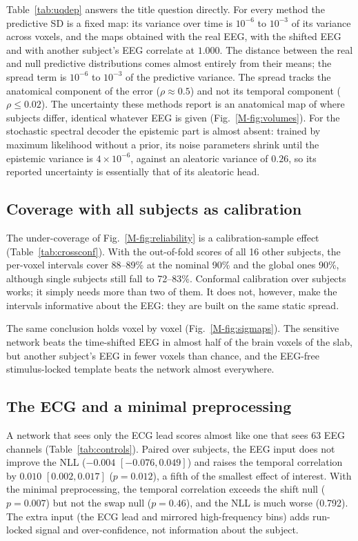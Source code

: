 Table~\ref{tab:uqdep} answers the title question directly. For every method the predictive SD is a fixed map: its variance over time is $10^{-6}$ to $10^{-3}$ of its variance across voxels, and the maps obtained with the real EEG, with the shifted EEG and with another subject's EEG correlate at $1.000$. The distance between the real and null predictive distributions comes almost entirely from their means; the spread term is $10^{-6}$ to $10^{-3}$ of the predictive variance. The spread tracks the anatomical component of the error ($\rho\approx0.5$) and not its temporal component ($\rho\le0.02$). The uncertainty these methods report is an anatomical map of where subjects differ, identical whatever EEG is given (Fig.~\ref{M-fig:volumes}). For the stochastic spectral decoder the epistemic part is almost absent: trained by maximum likelihood without a prior, its noise parameters shrink until the epistemic variance is $4\times10^{-6}$, against an aleatoric variance of $0.26$, so its reported uncertainty is essentially that of its aleatoric head.

\subsection{Coverage with all subjects as calibration}\label{sec:res:crossconformal}
The under-coverage of Fig.~\ref{M-fig:reliability} is a calibration-sample effect (Table~\ref{tab:crossconf}). With the out-of-fold scores of all 16 other subjects, the per-voxel intervals cover 88--89\% at the nominal 90\% and the global ones 90\%, although single subjects still fall to 72--83\%. Conformal calibration over subjects works; it simply needs more than two of them. It does not, however, make the intervals informative about the EEG: they are built on the same static spread.



The same conclusion holds voxel by voxel (Fig.~\ref{M-fig:sigmaps}). The sensitive network beats the time-shifted EEG in almost half of the brain voxels of the slab, but another subject's EEG in fewer voxels than chance, and the EEG-free stimulus-locked template beats the network almost everywhere.

\subsection{The ECG and a minimal preprocessing}\label{sec:res:controls}
A network that sees only the ECG lead scores almost like one that sees 63 EEG channels (Table~\ref{tab:controls}). Paired over subjects, the EEG input does not improve the NLL ($-0.004$ $[-0.076, 0.049]$) and raises the temporal correlation by $0.010$ $[0.002, 0.017]$ ($p=0.012$), a fifth of the smallest effect of interest. With the minimal preprocessing, the temporal correlation exceeds the shift null ($p=0.007$) but not the swap null ($p=0.46$), and the NLL is much worse (0.792). The extra input (the ECG lead and mirrored high-frequency bins) adds run-locked signal and over-confidence, not information about the subject.

